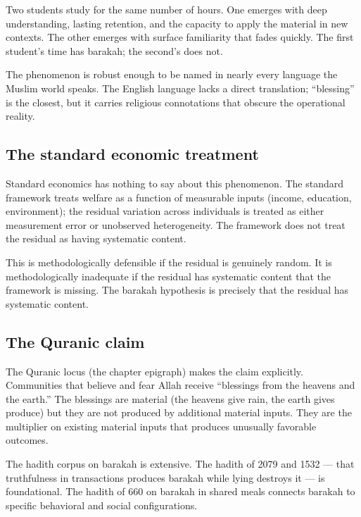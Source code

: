 Two students study for the same number of hours. One emerges with
deep understanding, lasting retention, and the capacity to apply
the material in new contexts. The other emerges with surface
familiarity that fades quickly. The first student's time has
barakah; the second's does not.

The phenomenon is robust enough to be named in nearly every
language the Muslim world speaks. The English language lacks a
direct translation; ``blessing'' is the closest, but it carries
religious connotations that obscure the operational reality.

\subsection{The standard economic treatment}

Standard economics has nothing to say about this phenomenon. The
standard framework treats welfare as a function of measurable
inputs (income, education, environment); the residual variation
across individuals is treated as either measurement error or
unobserved heterogeneity. The framework does not treat the
residual as having systematic content.

This is methodologically defensible if the residual is genuinely
random. It is methodologically inadequate if the residual has
systematic content that the framework is missing. The barakah
hypothesis is precisely that the residual has systematic content.

\subsection{The Quranic claim}

The Quranic locus  (the chapter epigraph) makes the
claim explicitly. Communities that believe and fear Allah receive
``blessings from the heavens and the earth.'' The blessings are
material (the heavens give rain, the earth gives produce) but they
are not produced by additional material inputs. They are the
multiplier on existing material inputs that produces unusually
favorable outcomes.

The hadith corpus on barakah is extensive. The hadith of
 2079 and  1532 ---
that truthfulness in transactions produces barakah while lying
destroys it --- is foundational. The hadith of  660 on barakah in shared meals connects barakah to
specific behavioral and social configurations.


